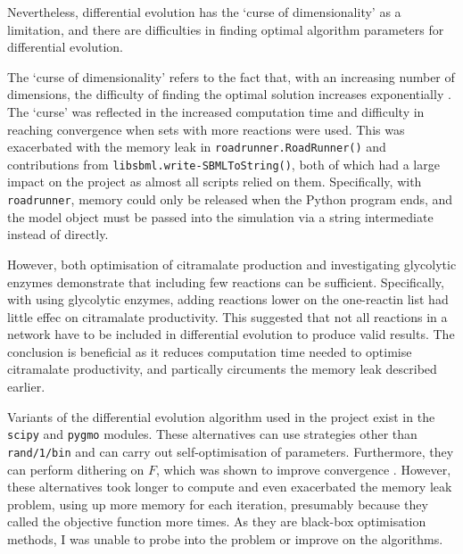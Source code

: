 \documentclass[parskip=full, numbers=noenddot]{scrreprt}
\begin{document}
Nevertheless, differential evolution has the `curse of dimensionality' as a limitation, and there are difficulties in finding optimal algorithm parameters for differential evolution.

The `curse of dimensionality' refers to the fact that, with an increasing number of dimensions, the difficulty of finding the optimal solution increases exponentially \cite{mier_small_2017}. The `curse' was reflected in the increased computation time and difficulty in reaching convergence when sets with more reactions were used. This was exacerbated with the memory leak in \texttt{roadrunner.RoadRunner()} and contributions from \texttt{libsbml.write-SBMLToString()}, both of which had a large impact on the project as almost all scripts relied on them. Specifically, with \texttt{roadrunner}, memory could only be released when the Python program ends, and the model object must be passed into the simulation via a string intermediate instead of directly.

However, both optimisation of citramalate production and investigating glycolytic enzymes demonstrate that including few reactions can be sufficient. Specifically, with using glycolytic enzymes, adding reactions lower on the one-reactin list had little effec on citramalate productivity. This suggested that not all reactions in a network have to be included in differential evolution to produce valid results. The conclusion is beneficial as it reduces computation time needed to optimise citramalate productivity, and partically circuments the memory leak described earlier.

Variants of the differential evolution algorithm used in the project exist in the \texttt{scipy} and \texttt{pygmo} modules. These alternatives can use strategies other than \texttt{rand/1/bin} and can carry out self-optimisation of parameters. Furthermore, they can perform dithering on $F$, which was shown to improve convergence \citep{storn_usage_1996}. However, these alternatives took longer to compute and even exacerbated the memory leak problem, using up more memory for each iteration, presumably because they called the objective function more times. As they are black-box optimisation methods, I was unable to probe into the problem or improve on the algorithms.

\end{document}
